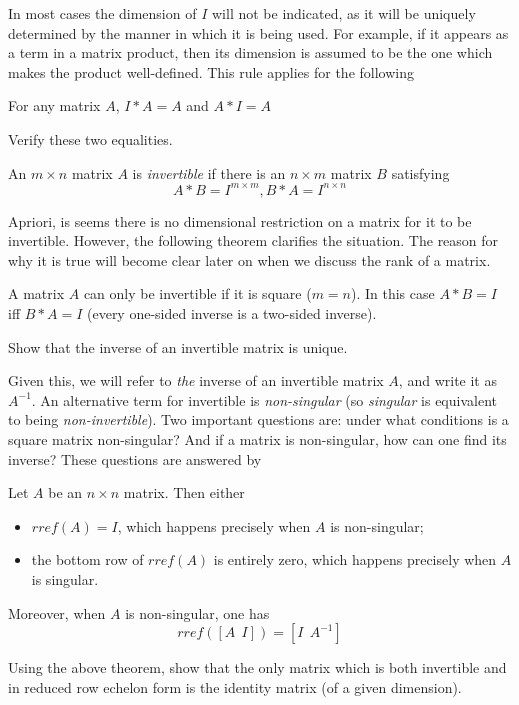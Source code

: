 \documentclass{ximera}
\begin{document}
In most cases the dimension of $I$ will not be indicated, as it will be uniquely determined by the manner in which it is being used. For example, if it appears as a term in a matrix product, then its dimension is assumed to be the one which makes the product well-defined. This rule applies for the following 

\begin{proposition} For any matrix $A$, $I*A = A$ and $A*I = A$
\end{proposition}

\begin{exercise} Verify these two equalities.
\end{exercise}

\begin{definition} An $m\times n$ matrix $A$ is {\it invertible} if there is an $n\times m$ matrix $B$ satisfying
\[
A*B = I^{m\times m}, B*A = I^{n\times n}
\]
\end{definition}

Apriori, is seems there is no dimensional restriction on a matrix for it to be invertible. However, the following theorem clarifies the situation. The reason for why it is true will become clear later on when we discuss the rank of a matrix.

\begin{theorem} A matrix $A$ can only be invertible if it is square ($m = n$). In this case $A*B =I$ iff $B*A = I$ (every one-sided inverse is a two-sided inverse).
\end{theorem}

\begin{exercise} Show that the inverse of an invertible matrix is unique.
\end{exercise}

Given this, we will refer to {\it the} inverse of an invertible matrix $A$, and write it as $A^{-1}$. An alternative term for invertible is {\it non-singular} (so {\it singular} is equivalent to being  {\it non-invertible}). Two important questions are: under what conditions is a square matrix non-singular? And if a matrix is non-singular, how can one find its inverse? These questions are answered by 

\begin{theorem} Let $A$ be an $n\times n$ matrix. Then either
\begin{itemize}
\item $rref(A) = I$, which happens precisely when $A$ is non-singular;
\item the bottom row of $rref(A)$ is entirely zero, which happens precisely when $A$ is singular.
\end{itemize}
Moreover, when $A$ is non-singular, one has
\[
rref([A\ \ I]) = [I\ \ A^{-1}]
\]
\end{theorem}

\begin{exercise} Using the above theorem, show that the only matrix which is both invertible and in reduced row echelon form is the identity matrix (of a given dimension).

\end{exercise}
\end{document}
